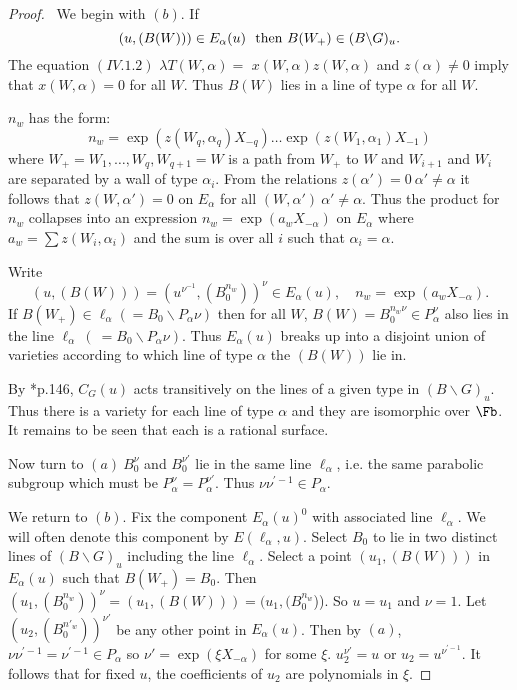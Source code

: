 \documentclass{memo-l}
\theoremstyle{definition}
\theoremstyle{remark}
\numberwithin{section}{chapter}
\numberwithin{equation}{chapter}
\begin{document}
\medpagebreak

\begin{proof} \ We begin with $(b)$.  If $$(u,(B(W))) \in
E_{{\alpha}}(u)\ \hbox{ then} \ B(W_+) \in (B\backslash G)_{u}.$$  The equation
$(IV.1.2)$  ${\lambda}T(W,{\alpha})  =$ $x(W,{\alpha})z(W,{\alpha})$ and
$z({\alpha}) \ne 0$ imply that $x(W,{\alpha})  =  0$ for all $W$.  Thus $B(W)$
lies in a line of type ${\alpha}$ for all $W$.

   $n_{w}$ has the form:
$$
n_{w}  =  \exp(z(W_{q},{\alpha}_{q})X_{-q})\ldots
\exp(z(W_{1},{\alpha}_{1})X_{-1})
$$
where $W_{+}  =  W_{1},\ldots ,W_{q},W_{q+1}  =  W$ is a path from $W_{+}$ to $W$
and $W_{i+1}$ and $W_{i}$ are separated by a wall of type ${\alpha}_{i}$.
From the relations $z({\alpha}') = 0 \ {\alpha}'\ne {\alpha}$ it follows that
$z(W,{\alpha}')  =  0$ on $E_{{\alpha}}$ for all $(W,{\alpha}') \ {\alpha}' \ne
{\alpha}$.  Thus the product for $n_{w}$ collapses into an expression
$n_{w}  =  \exp(a_{w}X_{-{\alpha}})$ on $E_{{\alpha}}$ where $a_{w}  =
\sum z(W_{i},{\alpha}_{i})$ and the sum is over all $i$ such that
${\alpha}_{i}  =  {\alpha}$.

   Write $$(u,(B(W)))  =  (u^{\nu^{-1}},(B_{0}^{n_w}))^{\nu} \in
E_{{\alpha}}(u), \quad n_{w}  =  \exp(a_{w}X_{-{\alpha}}).$$  If
$B(W_{+}) \in {\ell}_{{\alpha}} ( =  B_{0}\backslash P_{{\alpha}}{\nu} )$
then for all $W$, $B(W)  =  B_{0}^{n_{w}{\nu}} \in P_{{\alpha}}^{\nu}$
also lies in the line ${\ell}_{{\alpha}} \  (\  =  B_{0}\backslash
P_{{\alpha}}{\nu} )$.  Thus $E_{{\alpha}}(u)$ breaks up into a disjoint
union of varieties according to which line of type ${\alpha}$ the $(B(W))$
lie in.

   By \cite{MR672610}*{p.146},  $C_{G}(u)$ acts transitively on the lines of a given
type in $(B\backslash G)_{u}$.  Thus there is a variety for each line of
type ${\alpha}$ and they are isomorphic over $\Fb$. It remains to be
seen that each is a rational surface.

   Now turn to $(a) \ B_{0}^{{\nu}}$ and $B_{0}^{{\nu}'}$ lie in the same
line ${\ell}_{{\alpha}}$, i.e.  the same parabolic subgroup which must be
$P_{{\alpha}}^{{\nu}}  =  P_{{\alpha}}^{{\nu}'}$.  Thus ${\nu}{\nu}^{\prime-1}
\in P_{{\alpha}}$.

   We return to $(b)$.  Fix the component $E_{{\alpha}}(u)^{0}$ with
associated line ${\ell}_{{\alpha}}$.  We will often denote this component
by $E({\ell}_{{\alpha}},u)$.  Select $B_{0}$ to lie in two distinct lines
of $(B\backslash G)_{u}$ including the line ${\ell}_{{\alpha}}$.  Select a
point $(u_{1},(B(W)))$ in $E_{{\alpha}}(u)$ such that $B(W_{+})  =  B_{0}$.
Then $(u_{1},(B_{0}^{n_{w}}))^{\nu}  =  (u_{1},(B(W)))  =
(u_{1},(B_{0}^{n_{w}}$)).  So $u  =  u_{1}$ and ${\nu}  =  1$.  Let
$(u_{2},(B_{0}^{n'_{w}}))^{\nu'}$ be any other point in
$E_{{\alpha}}(u)$.  Then by $(a)$, \
$\nu\nu^{\prime-1}  =  \nu^{\prime-1} \in
P_{{\alpha}}$ so ${\nu}'  =  \exp({\xi}X_{-{\alpha}})$ for some ${\xi}$.
$u_{2}^{{\nu}'}  =  u$ or $u_{2}  =  u^{\nu^{\prime-1}}.$ It follows that
for fixed $u$, the coefficients of $u_{2}$ are polynomials in ${\xi}$.


\end{proof}
\end{document}
